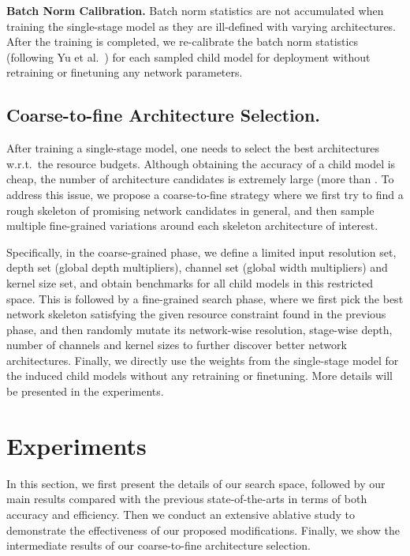 \documentclass[runningheads]{llncs}
\begin{document}
\textbf{Batch Norm Calibration.}
Batch norm statistics are not accumulated when training the single-stage model as they are ill-defined with varying architectures. After the training is completed, we re-calibrate the batch norm statistics (following Yu et al.~\cite{yu2019universally}) for each sampled child model for deployment without retraining or finetuning any network parameters.

\subsection{Coarse-to-fine Architecture Selection.}
After training a single-stage model, one needs to select the best architectures w.r.t.\ the resource budgets. Although obtaining the accuracy of a child model is cheap, the number of architecture candidates is extremely large (more than . To address this issue, we propose a coarse-to-fine strategy where we first try to find a rough skeleton of promising network candidates in general, and then sample multiple fine-grained variations around each skeleton architecture of interest.

Specifically, in the coarse-grained phase, we define a limited input resolution set, depth set (global depth multipliers), channel set (global width multipliers) and kernel size set, and obtain benchmarks for all child models in this restricted space. This is followed by a fine-grained search phase, where we first pick the best network skeleton satisfying the given resource constraint found in the previous phase, and then randomly mutate its network-wise resolution, stage-wise depth, number of channels and kernel sizes to further discover better network architectures. Finally, we directly use the weights from the single-stage model for the induced child models without any retraining or finetuning. More details will be presented in the experiments.
 
\section{Experiments}
In this section, we first present the details of our search space, followed by our main results compared with the previous state-of-the-arts in terms of both accuracy and efficiency. Then we conduct an extensive ablative study to demonstrate the effectiveness of our proposed modifications. Finally, we show the intermediate results of our coarse-to-fine architecture selection.
\end{document}
